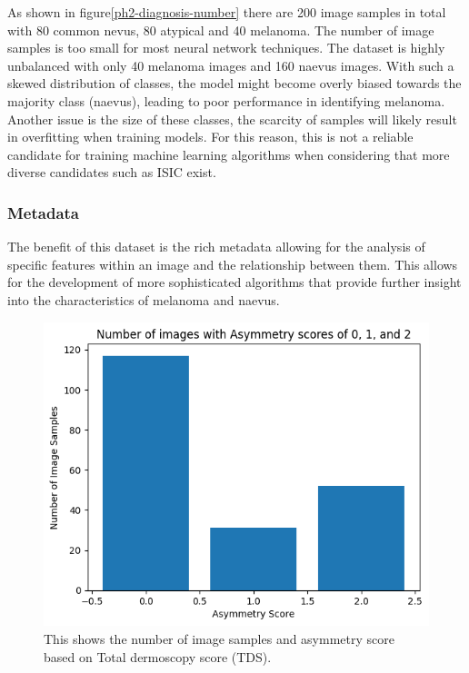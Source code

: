 As shown in figure\ref{ph2-diagnosis-number} there are 200 image samples in total with 80 common nevus, 80 atypical and 40 melanoma. The number of image samples is too small for most neural network techniques. The dataset is highly unbalanced with only 40 melanoma images and 160 naevus images. With such a skewed distribution of classes, the model might become overly biased towards the majority class (naevus), leading to poor performance in identifying melanoma. Another issue is the size of these classes, the scarcity of samples will likely result in overfitting when training models. For this reason, this is not a reliable candidate for training machine learning algorithms when considering that more diverse candidates such as ISIC exist.

\subsubsection{Metadata}
The benefit of this dataset is the rich metadata allowing for the analysis of specific features within an image and the relationship between them. This allows for the development of more sophisticated algorithms that provide further insight into the characteristics of melanoma and naevus.

\begin{figure}
    \centering
    \includegraphics[scale=0.75]{images/ph2/ph2-asym-number.png}
    \caption{This shows the number of image samples and asymmetry score based on Total dermoscopy score (TDS).} 
\end{figure}\label{ph2-asym-number}

